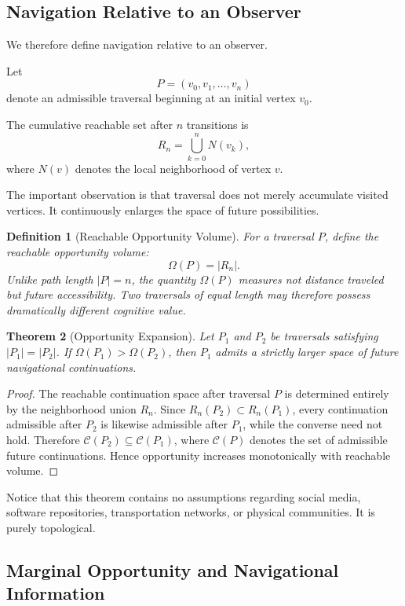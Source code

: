 \documentclass[12pt,oneside]{article}
\newtheorem{definition}{Definition}[section]
\newtheorem{theorem}[definition]{Theorem}
\theoremstyle{remark}
\begin{document}
\subsection{Navigation Relative to an Observer}

We therefore define navigation relative to an observer.

Let
\[
P=(v_0,v_1,\ldots,v_n)
\]
denote an admissible traversal beginning at an initial vertex \(v_0\).

The cumulative reachable set after \(n\) transitions is
\[
R_n = \bigcup_{k=0}^{n} N(v_k),
\]
where \(N(v)\) denotes the local neighborhood of vertex \(v\).

The important observation is that traversal does not merely accumulate visited vertices. It continuously enlarges the space of future possibilities.

\begin{definition}[Reachable Opportunity Volume]
For a traversal \(P\), define the reachable opportunity volume:
\[
\Omega(P) = |R_n|.
\]
Unlike path length \(|P| = n\), the quantity \(\Omega(P)\) measures not distance traveled but future accessibility. Two traversals of equal length may therefore possess dramatically different cognitive value.
\end{definition}

\begin{theorem}[Opportunity Expansion]
Let \(P_1\) and \(P_2\) be traversals satisfying \(|P_1| = |P_2|\). If \(\Omega(P_1) > \Omega(P_2)\), then \(P_1\) admits a strictly larger space of future navigational continuations.
\end{theorem}

\begin{proof}
The reachable continuation space after traversal \(P\) is determined entirely by the neighborhood union \(R_n\). Since \(R_n(P_2) \subset R_n(P_1)\), every continuation admissible after \(P_2\) is likewise admissible after \(P_1\), while the converse need not hold. Therefore \(\mathcal{C}(P_2) \subseteq \mathcal{C}(P_1)\), where \(\mathcal{C}(P)\) denotes the set of admissible future continuations. Hence opportunity increases monotonically with reachable volume.
\end{proof}

Notice that this theorem contains no assumptions regarding social media, software repositories, transportation networks, or physical communities. It is purely topological.

\subsection{Marginal Opportunity and Navigational Information}
\end{document}
